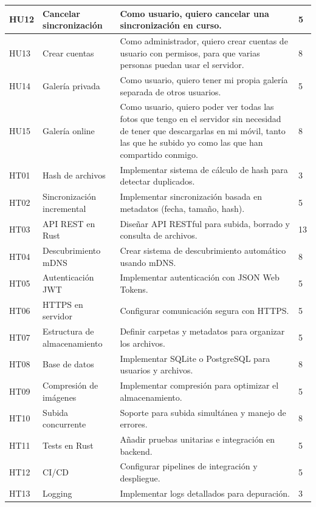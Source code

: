 \begin{tabularx}{\textwidth}{|l|l|>{\raggedright\arraybackslash}X|p{2cm}|}
    \hline
    HU12 & Cancelar sincronización & Como usuario, quiero cancelar una sincronización en curso. & 5 \\
    \hline
    HU13 & Crear cuentas & Como administrador, quiero crear cuentas de usuario con permisos, para que varias personas puedan usar el servidor. & 8 \\
    \hline
    HU14 & Galería privada & Como usuario, quiero tener mi propia galería separada de otros usuarios. & 5 \\
    \hline
    HU15 & Galería online & Como usuario, quiero poder ver todas las fotos que tengo en el servidor sin necesidad de tener que descargarlas en mi móvil, tanto las que he subido yo como las que han compartido conmigo. & 8 \\
    \hline
    HT01 & Hash de archivos & Implementar sistema de cálculo de hash para detectar duplicados. & 3 \\
    \hline
    HT02 & Sincronización incremental & Implementar sincronización basada en metadatos (fecha, tamaño, hash). & 5 \\
    \hline
    HT03 & API REST en Rust & Diseñar API RESTful para subida, borrado y consulta de archivos. & 13 \\
    \hline
    HT04 & Descubrimiento mDNS & Crear sistema de descubrimiento automático usando mDNS. & 8 \\
    \hline
    HT05 & Autenticación JWT & Implementar autenticación con JSON Web Tokens. & 5 \\
    \hline
    HT06 & HTTPS en servidor & Configurar comunicación segura con HTTPS. & 5 \\
    \hline
    HT07 & Estructura de almacenamiento & Definir carpetas y metadatos para organizar los archivos. & 5 \\
    \hline
    HT08 & Base de datos & Implementar SQLite o PostgreSQL para usuarios y archivos. & 8 \\
    \hline
    HT09 & Compresión de imágenes & Implementar compresión para optimizar el almacenamiento. & 5 \\
    \hline
    HT10 & Subida concurrente & Soporte para subida simultánea y manejo de errores. & 8 \\
    \hline
    HT11 & Tests en Rust & Añadir pruebas unitarias e integración en backend. & 5 \\
    \hline
    HT12 & CI/CD & Configurar pipelines de integración y despliegue. & 5 \\
    \hline
    HT13 & Logging & Implementar logs detallados para depuración. & 3 \\

\end{tabularx}
